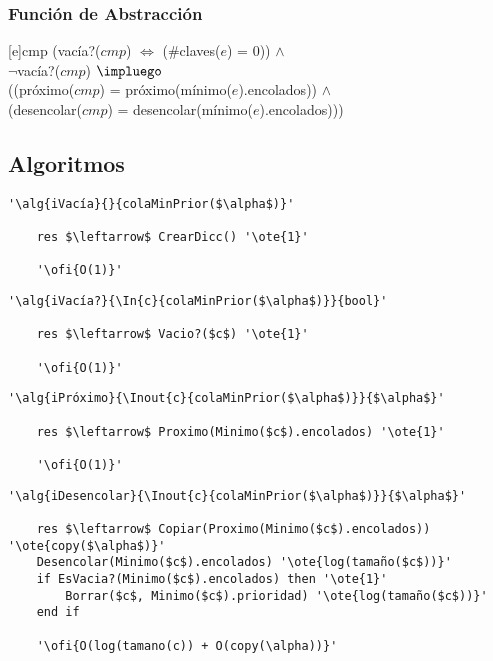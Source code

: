 	\subsubsection{Función de Abstracción}


		[e]{cmp}{
			(vacía?($cmp$) $\Leftrightarrow$ (\#claves($e$) = 0)) $\land$ \\
			\- $\neg$vacía?($cmp$) $\impluego$ \\
			\- \- ((próximo($cmp$) = próximo(mínimo($e$).encolados)) $\land$ \\
			\- \- (desencolar($cmp$) = desencolar(mínimo($e$).encolados)))
		}

\subsection{Algoritmos}
	\lstset{style=alg}

	\begin{lstlisting}[mathescape]
	'\alg{iVacía}{}{colaMinPrior($\alpha$)}'

	res $\leftarrow$ CrearDicc() '\ote{1}'

	'\ofi{O(1)}'
	\end{lstlisting}

	\begin{lstlisting}[mathescape]
	'\alg{iVacía?}{\In{c}{colaMinPrior($\alpha$)}}{bool}'

	res $\leftarrow$ Vacio?($c$) '\ote{1}'

	'\ofi{O(1)}'
	\end{lstlisting}

	\begin{lstlisting}[mathescape]
	'\alg{iPróximo}{\Inout{c}{colaMinPrior($\alpha$)}}{$\alpha$}'

	res $\leftarrow$ Proximo(Minimo($c$).encolados) '\ote{1}'

	'\ofi{O(1)}'
	\end{lstlisting}

	\begin{lstlisting}[mathescape]
	'\alg{iDesencolar}{\Inout{c}{colaMinPrior($\alpha$)}}{$\alpha$}'

	res $\leftarrow$ Copiar(Proximo(Minimo($c$).encolados)) '\ote{copy($\alpha$)}'
	Desencolar(Minimo($c$).encolados) '\ote{log(tamaño($c$))}'
	if EsVacia?(Minimo($c$).encolados) then '\ote{1}'
		Borrar($c$, Minimo($c$).prioridad) '\ote{log(tamaño($c$))}'
	end if

	'\ofi{O(log(tamano(c)) + O(copy(\alpha))}'
	\end{lstlisting}

